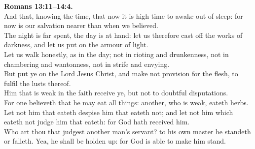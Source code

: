 \documentclass[10pt]{article} %
\begin{document}
{\begin{minipage}[t]{0.45\textwidth}
\textbf{Romans 13:11--14:4.}\\
And that, knowing the time, that now it is high time to awake out of sleep: for now is our salvation nearer than when we believed.\\
The night is far spent, the day is at hand: let us therefore cast off the works of darkness, and let us put on the armour of light.\\
Let us walk honestly, as in the day; not in rioting and drunkenness, not in chambering and wantonness, not in strife and envying.\\
But put ye on the Lord Jesus Christ, and make not provision for the flesh, to fulfil the lusts thereof.\\
Him that is weak in the faith receive ye, but not to doubtful disputations.\\
For one believeth that he may eat all things: another, who is weak, eateth herbs.\\
Let not him that eateth despise him that eateth not; and let not him which eateth not judge him that eateth: for God hath received him.\\
Who art thou that judgest another man's servant? to his own master he standeth or falleth. Yea, he shall be holden up: for God is able to make him stand.
\end{minipage}}
\vspace*{\fill}
\newpage
\Huge%
\vspace*{\fill}
\begin{spacing}{1.3}%
\end{spacing}
\vspace*{\fill}
\end{document}
